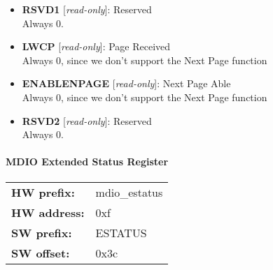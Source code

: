 \begin{itemize}
\item \begin{small}
{\bf 
RSVD1
} [\emph{read-only}]: Reserved
\\
Always 0.
\end{small}
\item \begin{small}
{\bf 
LWCP
} [\emph{read-only}]: Page Received
\\
Always 0, since we don't support the Next Page function
\end{small}
\item \begin{small}
{\bf 
ENABLENPAGE
} [\emph{read-only}]: Next Page Able
\\
Always 0, since we don't support the Next Page function
\end{small}
\item \begin{small}
{\bf 
RSVD2
} [\emph{read-only}]: Reserved
\\
Always 0.
\end{small}
\end{itemize}
\paragraph*{MDIO Extended Status Register}\vspace{12pt}

\begin{tabular}{l l }
{\bf HW prefix:}  & mdio\_estatus\\
{\bf HW address:}  & 0xf\\
{\bf SW prefix:}  & ESTATUS\\
{\bf SW offset:}  & 0x3c\\
\end{tabular}



